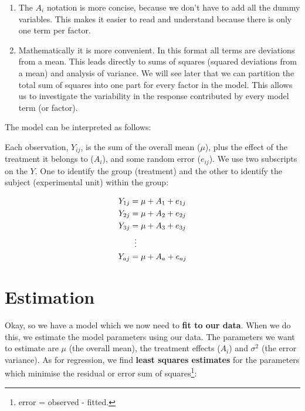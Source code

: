 \documentclass[
  letterpaper,
]{book}
\begin{document}
\begin{tcolorbox}
\begin{enumerate}
\def\labelenumi{\arabic{enumi}.}
\item
  The \(A_i\) notation is more concise, because we don't have to add all
  the dummy variables. This makes it easier to read and understand
  because there is only one term per factor.
\item
  Mathematically it is more convenient. In this format all terms are
  deviations from a mean. This leads directly to sums of
  squares\footnotemark{} (squared deviations from a mean) and analysis
  of variance. We will see later that we can partition the total sum of
  squares into one part for every factor in the model. This allows us to
  investigate the variability in the response contributed by every model
  term (or factor).
\end{enumerate}

\end{tcolorbox}


The model can be interpreted as follows:

Each observation, \(Y_{ij}\), is the sum of the overall mean (\(\mu\)),
plus the effect of the treatment it belongs to (\(A_i\)), and some
random error (\(e_{ij}\)). We use two subscripts on the \(Y\). One to
identify the group (treatment) and the other to identify the subject
(experimental unit) within the group:

\[
\begin{aligned}
Y_{1j} &= \mu + A_1 + e_{1j} \\ 
Y_{2j} &= \mu + A_2 + e_{2j} \\ 
Y_{3j} &= \mu + A_3 + e_{3j} \\
&\;\;\vdots \notag \\
Y_{aj} &= \mu + A_a + e_{aj} \\
\end{aligned}
\]

\section{Estimation}\label{estimation}

Okay, so we have a model which we now need to \textbf{fit to our data}.
When we do this, we estimate the model parameters using our data. The
parameters we want to estimate are \(\mu\) (the overall mean), the
treatment effects (\(A_i\)) and \(\sigma^2\) (the error variance). As
for regression, we find \textbf{least squares estimates} for the
parameters which minimise the residual or error sum of
squares\footnote{error = observed - fitted.}:
\end{document}
